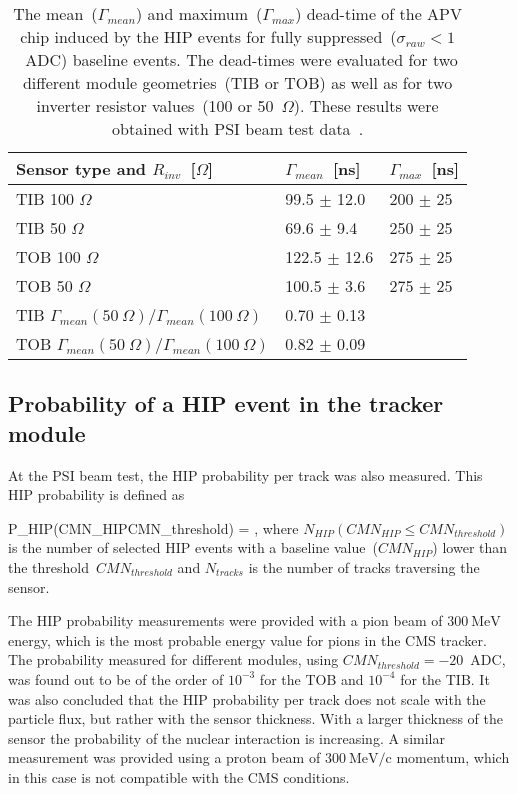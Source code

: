 \begin{table}[h]
\begin{center}
\begin{tabular}{|l|l|l|}
\hline
Sensor type and $R_{inv}$~[$\Omega$] & $\Gamma_{mean}$~[ns]  & $\Gamma_{max}$~[ns] \\
\hline
\hline
TIB 100 $\Omega$ & 99.5 $\pm$ 12.0 & 200 $\pm$ 25 \\
TIB 50  $\Omega$ & 69.6 $\pm$ 9.4 & 250 $\pm$ 25 \\
TOB 100  $\Omega$ & 122.5 $\pm$ 12.6 & 275 $\pm$ 25 \\
TOB 50 $\Omega$  & 100.5 $\pm$ 3.6 & 275 $\pm$ 25 \\
\hline
TIB $\Gamma_{mean}(50~\Omega )/\Gamma_{mean}(100~\Omega)$ &  0.70 $\pm$ 0.13  & \\
TOB $\Gamma_{mean}(50~\Omega )/\Gamma_{mean}(100~\Omega)$ &  0.82 $\pm$ 0.09 & \\
\hline
\end{tabular}
\caption[Table caption text]{The mean~($\Gamma_{mean}$) and maximum~($\Gamma_{max}$) dead-time of the APV chip induced by the HIP events for fully suppressed~($\sigma_{raw}<1$~ADC) baseline events. The dead-times were evaluated for two different module geometries~(TIB or TOB) as well as for two inverter resistor values~(100 or 50~$\Omega$). These results were obtained with PSI beam test data~\cite{Bainbridge:2004jc}. }
\label{tab:tableDeadtimes}
\end{center}
\end{table}



\subsection{Probability of a HIP event in the tracker module~\label{sec:ProbPast}}

At the PSI beam test, the HIP probability per track was also measured. This HIP probability is defined as 

{
P_{HIP}(CMN_{HIP}\leq CMN_{threshold}) = ,
}
where $N_{HIP}(CMN_{HIP}\leq CMN_{threshold})$ is the number of selected HIP events with a baseline value~($CMN_{HIP}$) lower than the threshold~$CMN_{threshold}$ and $N_{tracks}$ is the number of tracks traversing the sensor.

The HIP probability measurements were provided with a pion beam of $300~\mathrm{MeV}$ energy, which is the most probable energy value for pions in the CMS tracker. The probability measured for different modules, using $CMN_{threshold}=-20$~ADC, was found out to be of the order of $10^{-3}$ for the TOB and $10^{-4}$ for the TIB. It was also concluded that the HIP probability per track does not scale with the particle flux, but rather with the sensor thickness. With a larger thickness of the sensor the probability of the nuclear interaction is increasing.  A similar measurement was provided using a proton beam of  $300~\mathrm{MeV/c}$ momentum, which in this case is not compatible with the CMS conditions.


